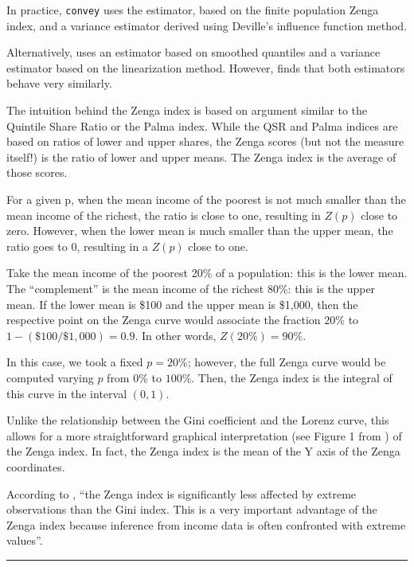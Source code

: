\documentclass[
]{book}
\begin{document}
In practice, \texttt{convey} uses the \textcite{barabesi2016} estimator, based on the finite population Zenga index, and a variance estimator derived using Deville's \autocite*{deville1999} influence function method.

Alternatively, \textcite{langel2011} uses an estimator based on smoothed quantiles and a variance estimator based on the \textcite{demnati2004} linearization method. However, \textcite{barabesi2016} finds that both estimators behave very similarly.

The intuition behind the Zenga index is based on argument similar to the Quintile Share Ratio or the Palma index. While the QSR and Palma indices are based on ratios of lower and upper shares, the Zenga scores (but not the measure itself!) is the ratio of lower and upper means. The Zenga index is the average of those scores.

For a given p, when the mean income of the poorest is not much smaller than the mean income of the richest, the ratio is close to one, resulting in \(Z(p)\) close to zero. However, when the lower mean is much smaller than the upper mean, the ratio goes to 0, resulting in a \(Z(p)\) close to one.

Take the mean income of the poorest 20\% of a population: this is the lower mean. The ``complement'' is the mean income of the richest 80\%: this is the upper mean. If the lower mean is \$100 and the upper mean is \$1,000, then the respective point on the Zenga curve would associate the fraction \(20\)\% to \(1 - ( \$100 / \$1,000 ) = 0.9\). In other words, \(Z(20\%) = 90\%\).

In this case, we took a fixed \(p = 20\)\%; however, the full Zenga curve would be computed varying \(p\) from \(0\)\% to \(100\)\%. Then, the Zenga index is the integral of this curve in the interval \((0,1)\).

Unlike the relationship between the Gini coefficient and the Lorenz curve, this allows for a more straightforward graphical interpretation (see Figure 1 from \textcite{langel2011}) of the Zenga index. In fact, the Zenga index is the mean of the Y axis of the Zenga coordinates.

According to \textcite{langel2011}, ``the Zenga index is significantly less affected by extreme observations than the Gini index. This is a very important advantage of the Zenga index because inference from income data is often confronted with extreme values''.

\begin{center}\rule{0.5\linewidth}{0.5pt}\end{center}
\end{document}
